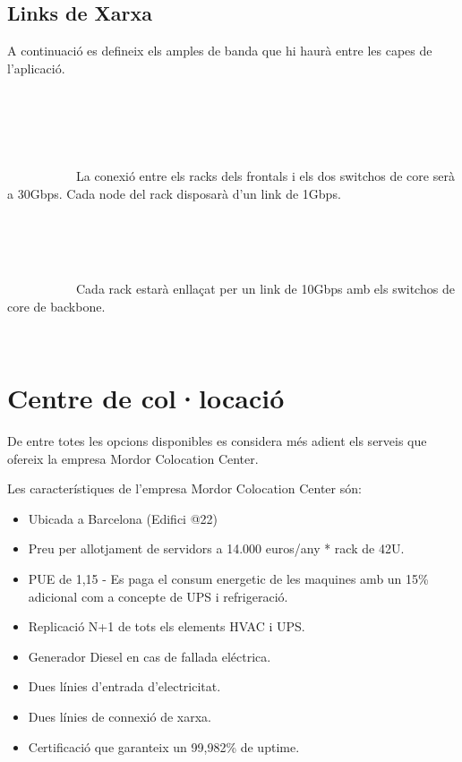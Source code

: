\documentclass[a4paper, 11pt]{article}
\begin{document}
\subsection{Links de Xarxa}

A continuació es defineix els amples de banda que hi haurà entre les capes de l'aplicació. 

    \begin{description}
        \item[Frontals] \hfill \\
            La conexió entre els racks dels frontals i els dos switchos de core serà a 30Gbps. Cada node del rack disposarà d'un link de 1Gbps.
        
        \item[LoadBalancers] \hfill \\
        
        \item[Emmagatzematge] \hfill \\
            Cada rack estarà enllaçat per un link de 10Gbps amb els switchos de core de backbone.
            
    \end{description}
    

\section{Centre de col·locació}

De entre totes les opcions disponibles es considera més adient els serveis que ofereix la empresa Mordor Colocation Center. 

Les característiques de l’empresa Mordor Colocation Center són:

\begin{itemize}
\item Ubicada a Barcelona (Edifici @22)
\item Preu per allotjament de servidors a 14.000 euros/any * rack de 42U.
\item PUE de 1,15 - Es paga el consum energetic de les maquines amb un 15\% adicional com a concepte de UPS i refrigeració.
\item Replicació N+1 de tots els elements HVAC i UPS.
\item Generador Diesel en cas de fallada eléctrica.
\item Dues línies d’entrada d’electricitat.
\item Dues línies de connexió de xarxa.
\item Certificació que garanteix un 99,982\% de uptime.
\end{itemize}
\end{document}
